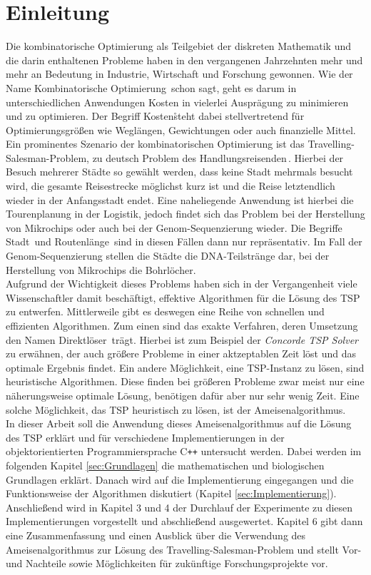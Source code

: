 \documentclass[doktyp=barbeit, sprache=german]{TUBAFarbeiten}
\begin{document}
\section{Einleitung}
Die kombinatorische Optimierung als Teilgebiet der diskreten Mathematik und die darin enthaltenen Probleme haben in den vergangenen Jahrzehnten mehr und mehr an Bedeutung in Industrie, Wirtschaft und Forschung gewonnen. Wie der Name \glqq Kombinatorische Optimierung\grqq\, schon sagt, geht es darum in unterschiedlichen Anwendungen Kosten in vielerlei Ausprägung zu minimieren und zu optimieren. Der Begriff \glqq Kosten\grqq\r steht dabei stellvertretend für Optimierungsgrößen wie Weglängen, Gewichtungen oder auch finanzielle Mittel.
\\Ein prominentes Szenario der kombinatorischen Optimierung ist das Travelling-Salesman-Problem, zu deutsch \glqq Problem des Handlungsreisenden\grqq\,. Hierbei der Besuch mehrerer Städte so gewählt werden, dass keine Stadt mehrmals besucht wird, die gesamte Reisestrecke möglichst kurz ist und die Reise letztendlich wieder in der Anfangsstadt endet. Eine naheliegende Anwendung ist hierbei die Tourenplanung in der Logistik, jedoch findet sich das Problem bei der Herstellung von Mikrochips \cite{Microchip} oder auch bei der Genom-Sequenzierung \cite{DNA} wieder. Die Begriffe \glqq Stadt\grqq\, und \glqq Routenlänge\grqq\, sind in diesen Fällen dann nur repräsentativ. Im Fall der Genom-Sequenzierung stellen die Städte die DNA-Teilstränge dar, bei der Herstellung von Mikrochips die Bohrlöcher.
\\Aufgrund der Wichtigkeit dieses Problems haben sich in der Vergangenheit viele Wissenschaftler damit beschäftigt, effektive Algorithmen für die Lösung des TSP zu entwerfen. Mittlerweile gibt es deswegen eine Reihe von schnellen und effizienten Algorithmen. Zum einen sind das exakte Verfahren, deren Umsetzung den Namen \glqq Direktlöser\grqq\, trägt. Hierbei ist zum Beispiel der \textit{Concorde TSP Solver} \cite{ConcordeMain} zu erwähnen, der auch größere Probleme in einer aktzeptablen Zeit löst und das optimale Ergebnis findet. Ein andere Möglichkeit, eine TSP-Instanz zu lösen, sind heuristische Algorithmen. Diese finden bei größeren Probleme zwar meist nur eine näherungsweise optimale Lösung, benötigen dafür aber nur sehr wenig Zeit. Eine solche Möglichkeit, das TSP heuristisch zu lösen, ist der Ameisenalgorithmus.
\\In dieser Arbeit soll die Anwendung dieses Ameisenalgorithmus auf die Lösung des TSP erklärt und für verschiedene Implementierungen in der objektorientierten Programmiersprache C\texttt{++} untersucht werden. Dabei werden im folgenden Kapitel \ref{sec:Grundlagen} die mathematischen und biologischen Grundlagen erklärt. Danach wird auf die Implementierung eingegangen und die Funktionsweise der Algorithmen diskutiert (Kapitel \ref{sec:Implementierung}). Anschließend wird in Kapitel 3 und 4 der Durchlauf der Experimente zu diesen Implementierungen vorgestellt und abschließend ausgewertet. Kapitel 6 gibt dann eine Zusammenfassung und einen Ausblick über die Verwendung des Ameisenalgorithmus zur Lösung des Travelling-Salesman-Problem und stellt Vor- und Nachteile sowie Möglichkeiten für zukünftige Forschungsprojekte vor.
\newpage
\end{document}
